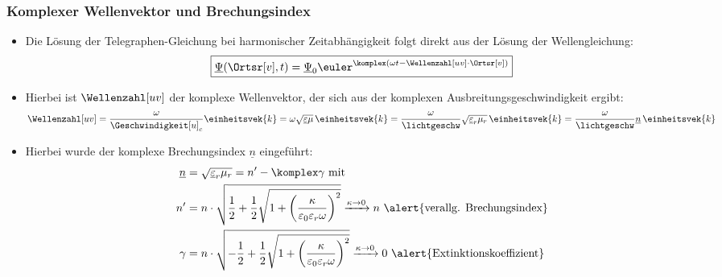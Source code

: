 \begin{frame}
  \frametitle{Komplexer Wellenvektor und Brechungsindex}
  \begin{itemize}[<+->]
  \item Die Lösung der Telegraphen-Gleichung bei harmonischer Zeitabhängigkeit folgt direkt aus der Lösung der Wellengleichung:
    \begin{equation*}
      \boxed{\underline{\Psi}(\Ortsr[v], t) = \underline{\Psi}_0 \euler^{\komplex(\omega t - \Wellenzahl[uv]\cdot\Ortsr[v])}} 
    \end{equation*}
  \item Hierbei ist \(\Wellenzahl[uv]\) der \alert{komplexe Wellenvektor}, der sich aus der komplexen Ausbreitungsgeschwindigkeit ergibt:
    \begin{equation*}
      \Wellenzahl[uv] = \frac{\omega}{\Geschwindigkeit[u]_c} \einheitsvek{k} = \omega \sqrt{\underline{\varepsilon}\mu}\, \einheitsvek{k}= \frac{\omega}{\lichtgeschw} \sqrt{\underline{\varepsilon}_r\mu_r}\, \einheitsvek{k} = \frac{\omega}{\lichtgeschw} \underline{n}\, \einheitsvek{k}
    \end{equation*}
  \item Hierbei wurde der \alert{komplexe Brechungsindex} \(\underline{n}\) eingeführt:
    \begin{align*}
      \underline{n} &= \sqrt{\underline{\varepsilon}_r\mu_r} = n^{\prime} - \komplex \gamma \text{ mit}\\
       n^{\prime} &= n\cdot \sqrt{ \frac{1}{2}+\frac{1}{2}\sqrt{1+ \left( \frac{\kappa}{\varepsilon_0\varepsilon_r\omega} \right)^2} } \xrightarrow{\kappa\to 0} n \text{ \alert{verallg. Brechungsindex}}\\                 
      \gamma &= n \cdot \sqrt{-\frac{1}{2}+\frac{1}{2}\sqrt{1+ \left( \frac{\kappa}{\varepsilon_0\varepsilon_r\omega} \right)^2} } \xrightarrow{\kappa\to 0} 0  \text{ \alert{Extinktionskoeffizient}}               
      \end{align*}
    \end{itemize}
  \end{frame}

